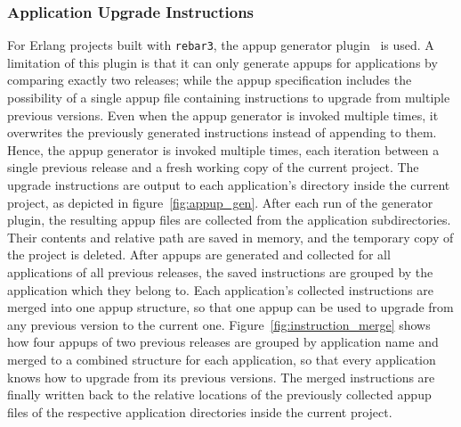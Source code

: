 {\subsubsection{Application Upgrade Instructions} For Erlang projects built with \lstinline|rebar3|, the \acrlong{appup} generator plugin~\cite{rebar3appup} is used. A limitation of this plugin is that it can only generate \acrshort{appup}s for applications by comparing exactly two releases; while the \acrshort{appup} specification includes the possibility of a single \acrshort{appup} file containing instructions to upgrade from multiple previous versions. Even when the \acrshort{appup} generator is invoked multiple times, it overwrites the previously generated instructions instead of appending to them. Hence, the \acrshort{appup} generator is invoked multiple times, each iteration between a single previous release and a fresh working copy of the current project. The upgrade instructions are output to each application's directory inside the current project, as depicted in figure~\ref{fig:appup_gen}. After each run of the generator plugin, the resulting \acrshort{appup} files are collected from the application subdirectories. Their contents and relative path are saved in memory, and the temporary copy of the project is deleted. After \acrshort{appup}s are generated and collected for all applications of all previous releases, the saved instructions are grouped by the application which they belong to. Each application's collected instructions are merged into one \acrshort{appup} structure, so that one \acrshort{appup} can be used to upgrade from any previous version to the current one. Figure~\ref{fig:instruction_merge} shows how four \acrshort{appup}s of two previous releases are grouped by application name and merged to a combined structure for each application, so that every application knows how to upgrade from its previous versions. The merged instructions are finally written back to the relative locations of the previously collected \acrshort{appup} files of the respective application directories inside the current project.

\cleardoublepage

}
